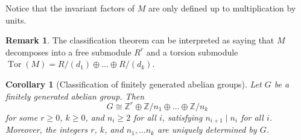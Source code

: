 \documentclass[12pt]{report}
\newtheorem{corollary}[theorem]{Corollary}
\numberwithin{equation}{section}
\numberwithin{theorem}{chapter}
\theoremstyle{definition}
\newtheorem*{basic properties}{Basic Properties}
\newtheorem*{Important Remark}{Important Remark}
\newtheorem{remark}[theorem]{Remark}
\DeclareMathOperator{\Tor}{Tor}
\begin{document}
Notice that the invariant factors of $M$ are only defined up to multiplication by units.

\begin{remark}
The classification theorem can be interpreted as saying that $M$ decomposes into a free submodule $R^r$ and a torsion submodule $\Tor(M)=R/(d_1) \oplus \dots \oplus R/(d_k)$.
\end{remark}



\begin{corollary}[Classification of finitely generated abelian groups]%
Let $G$ be a finitely generated abelian group. Then 
$$G \cong \mathbb{Z}^r \oplus \mathbb{Z}/n_1 \oplus \dots \oplus \mathbb{Z}/n_k$$ 
for some $r \geqslant 0$, $k \geqslant 0$, and $n_i \geqslant 2$ for all $i$, satisfying $n_{i+1} \mid n_i$ for all $i$. Moreover, the integers $r$, $k$, and $n_1,\ldots n_k$ are uniquely determined by $G$.
\end{corollary}
\end{document}
